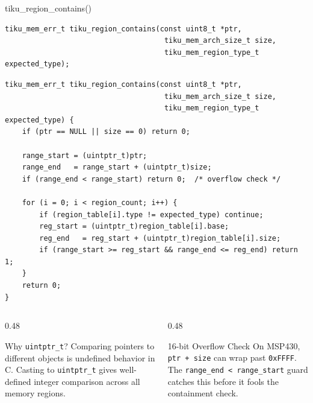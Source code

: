 \documentclass[aspectratio=169, 10pt]{beamer}
\begin{document}
\begin{frame}[fragile]{tiku\_region\_contains()}
\begin{lstlisting}[style=cstyle]
tiku_mem_err_t tiku_region_contains(const uint8_t *ptr,
                                     tiku_mem_arch_size_t size,
                                     tiku_mem_region_type_t expected_type);
\end{lstlisting}

\begin{lstlisting}[style=cstyle, title={kernel/memory/tiku\_region.c}]
tiku_mem_err_t tiku_region_contains(const uint8_t *ptr,
                                     tiku_mem_arch_size_t size,
                                     tiku_mem_region_type_t expected_type) {
    if (ptr == NULL || size == 0) return 0;

    range_start = (uintptr_t)ptr;
    range_end   = range_start + (uintptr_t)size;
    if (range_end < range_start) return 0;  /* overflow check */

    for (i = 0; i < region_count; i++) {
        if (region_table[i].type != expected_type) continue;
        reg_start = (uintptr_t)region_table[i].base;
        reg_end   = reg_start + (uintptr_t)region_table[i].size;
        if (range_start >= reg_start && range_end <= reg_end) return 1;
    }
    return 0;
}
\end{lstlisting}

\begin{columns}[T]
\begin{column}{0.48\textwidth}
\begin{alertblock}{Why \texttt{uintptr\_t}?}
Comparing pointers to different objects is undefined behavior
in C.  Casting to \texttt{uintptr\_t} gives well-defined integer
comparison across all memory regions.
\end{alertblock}
\end{column}
\begin{column}{0.48\textwidth}
\begin{alertblock}{16-bit Overflow Check}
On MSP430, \texttt{ptr + size} can wrap past \texttt{0xFFFF}.
The \texttt{range\_end < range\_start} guard catches this before
it fools the containment check.
\end{alertblock}
\end{column}
\end{columns}
\end{frame}
\end{document}
